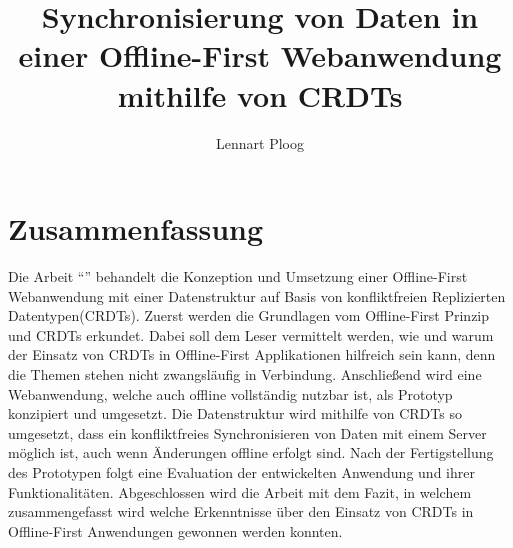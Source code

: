 \documentclass[a4paper, 12pt]{scrreprt}
\title{Synchronisierung von Daten in einer Offline-First Webanwendung mithilfe von CRDTs}
\subtitle{}
\author{Lennart Ploog}
\makeatletter
\let\inserttitle\@title
\makeatother
\begin{document}
\newpage
\section*{Zusammenfassung}
Die Arbeit \enquote{\inserttitle} behandelt die Konzeption und Umsetzung einer Offline-First Webanwendung mit einer Datenstruktur auf Basis von konfliktfreien Replizierten Datentypen(CRDTs). Zuerst werden die Grundlagen vom Offline-First Prinzip und CRDTs erkundet. Dabei soll dem Leser vermittelt werden, wie und warum der Einsatz von CRDTs in Offline-First Applikationen hilfreich sein kann, denn die Themen stehen nicht zwangsläufig in Verbindung. Anschließend wird eine Webanwendung, welche auch offline vollständig nutzbar ist, als Prototyp konzipiert und umgesetzt. Die Datenstruktur wird mithilfe von CRDTs so umgesetzt, dass ein konfliktfreies Synchronisieren von Daten mit einem Server möglich ist, auch wenn Änderungen offline erfolgt sind. Nach der Fertigstellung des Prototypen folgt eine Evaluation der entwickelten Anwendung und ihrer Funktionalitäten. Abgeschlossen wird die Arbeit mit dem Fazit, in welchem zusammengefasst wird welche Erkenntnisse über den Einsatz von CRDTs in Offline-First Anwendungen gewonnen werden konnten.
\end{document}

